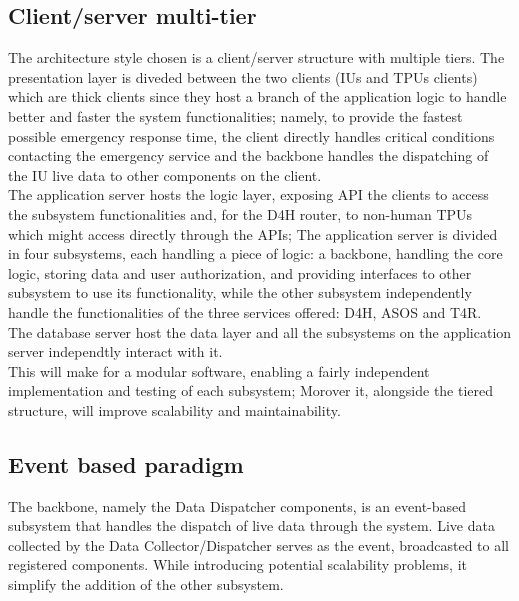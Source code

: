 \subsection{Client/server multi-tier}
The architecture style chosen is a client/server structure with multiple tiers. The presentation layer is diveded between the two clients (IUs and TPUs clients) which are thick clients since they host a branch of the application logic to handle better and faster the system functionalities; namely, to provide the fastest possible emergency response time, the client directly handles critical conditions contacting the emergency service and the backbone handles the dispatching of the IU live data to other components on the client. \\
The application server hosts the logic layer, exposing API the clients to access the subsystem functionalities and, for the D4H router, to non-human TPUs which might access directly through the APIs; The application server is divided in four subsystems, each handling a piece of logic: a backbone, handling the core logic, storing data and user authorization, and providing interfaces to other subsystem to use its functionality, while the other subsystem independently handle the functionalities of the three services offered: D4H, ASOS and T4R. \\
The database server host the data layer and all the subsystems on the application server independtly interact with it.
\\
This will make for a modular software, enabling a fairly independent implementation and testing of each subsystem; Morover it, alongside the tiered structure, will improve scalability and maintainability.

\subsection{Event based paradigm}
The backbone, namely the Data Dispatcher components, is an event-based subsystem that handles the dispatch of live data through the system. Live data collected by the Data Collector/Dispatcher serves as the event, broadcasted to all registered components. While introducing potential scalability problems, it simplify the addition of the other subsystem.

